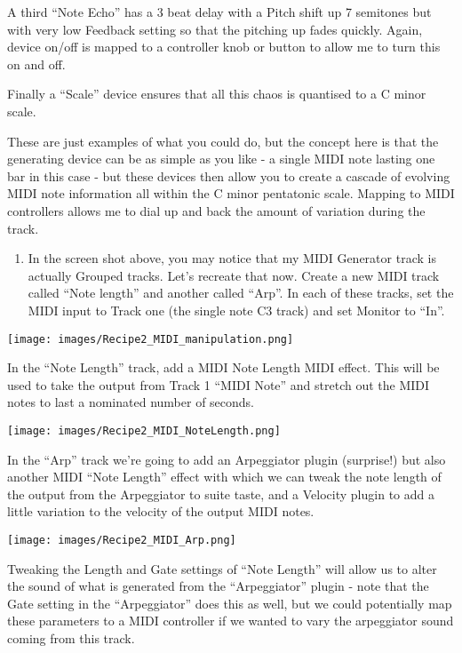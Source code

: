 \documentclass[
  12pt,
  letterpaper,
  oneside,
  open=any]{scrbook}
\providecommand{\tightlist}{%
  \setlength{\itemsep}{0pt}\setlength{\parskip}{0pt}}\usepackage{longtable,booktabs,array}
\begin{document}
A third ``Note Echo'' has a 3 beat delay with a Pitch shift up 7
semitones but with very low Feedback setting so that the pitching up
fades quickly. Again, device on/off is mapped to a controller knob or
button to allow me to turn this on and off.

Finally a ``Scale'' device ensures that all this chaos is quantised to a
C minor scale.

These are just examples of what you could do, but the concept here is
that the generating device can be as simple as you like - a single MIDI
note lasting one bar in this case - but these devices then allow you to
create a cascade of evolving MIDI note information all within the C
minor pentatonic scale. Mapping to MIDI controllers allows me to dial up
and back the amount of variation during the track.

\begin{enumerate}
\def\labelenumi{\arabic{enumi}.}
\setcounter{enumi}{6}
\tightlist
\item
  In the screen shot above, you may notice that my MIDI Generator track
  is actually Grouped tracks. Let's recreate that now. Create a new MIDI
  track called ``Note length'' and another called ``Arp''. In each of
  these tracks, set the MIDI input to Track one (the single note C3
  track) and set Monitor to ``In''.
\end{enumerate}

\texttt{[image: images/Recipe2\_MIDI\_manipulation.png]}

In the ``Note Length'' track, add a MIDI Note Length MIDI effect. This
will be used to take the output from Track 1 ``MIDI Note'' and stretch
out the MIDI notes to last a nominated number of seconds.

\texttt{[image: images/Recipe2\_MIDI\_NoteLength.png]}

In the ``Arp'' track we're going to add an Arpeggiator plugin
(surprise!) but also another MIDI ``Note Length'' effect with which we
can tweak the note length of the output from the Arpeggiator to suite
taste, and a Velocity plugin to add a little variation to the velocity
of the output MIDI notes.

\texttt{[image: images/Recipe2\_MIDI\_Arp.png]}

Tweaking the Length and Gate settings of ``Note Length'' will allow us
to alter the sound of what is generated from the ``Arpeggiator'' plugin
- note that the Gate setting in the ``Arpeggiator'' does this as well,
but we could potentially map these parameters to a MIDI controller if we
wanted to vary the arpeggiator sound coming from this track.
\end{document}
